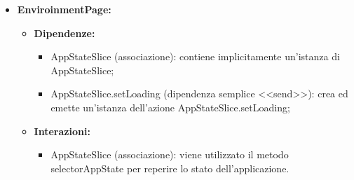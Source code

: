 \begin{itemize}
    \item \textbf{EnviroinmentPage:}
    \begin{itemize}
        \item \textbf{Dipendenze:}
        \begin{itemize}
            \item AppStateSlice (associazione): contiene implicitamente un'istanza di AppStateSlice;
            \item AppStateSlice.setLoading (dipendenza semplice <<send>>):  crea ed emette un’istanza dell’azione AppStateSlice.setLoading;
        \end{itemize} 
        \item \textbf{Interazioni:}
        \begin{itemize}
            \item AppStateSlice (associazione): viene utilizzato il metodo selectorAppState per reperire lo stato dell'applicazione.
        \end{itemize}  
    \end{itemize}
\end{itemize}


